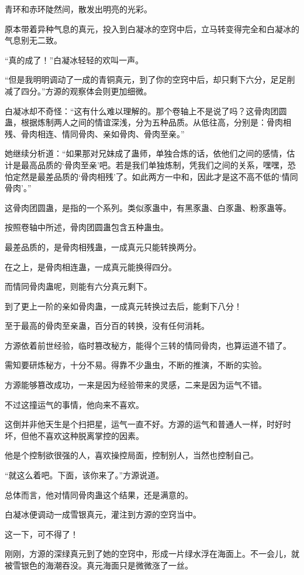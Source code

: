 \begin{this_body}
青环和赤环陡然间，散发出明亮的光彩。

原本带着异种气息的真元，投入到白凝冰的空窍中后，立马转变得完全和白凝冰的气息别无二致。

“真的成了！”白凝冰轻轻的欢叫一声。

“但是我明明调动了一成的青铜真元，到了你的空窍中后，却只剩下六分，足足削减了四分。”方源的观察体会则更加细微。

白凝冰却不奇怪：“这有什么难以理解的。那个卷轴上不是说了吗？这骨肉团圆蛊，根据炼制两人之间的情谊深浅，分为五种品质。从低往高，分别是：骨肉相残、骨肉相连、情同骨肉、亲如骨肉、骨肉至亲。”

她继续分析道：“如果那对兄妹成了蛊师，单独合炼的话，依他们之间的感情，估计是最高品质的‘骨肉至亲’吧。若是我们单独炼制，凭我们之间的关系，嘿嘿，恐怕定然是最差品质的‘骨肉相残’了。如此两方一中和，因此才是这不高不低的‘情同骨肉’。”

这骨肉团圆蛊，是指的一个系列。类似豕蛊中，有黑豕蛊、白豕蛊、粉豕蛊等。

按照卷轴中所述，骨肉团圆蛊包含五种蛊虫。

最差品质的，是骨肉相残蛊，一成真元只能转换两分。

在之上，是骨肉相连蛊，一成真元能换得四分。

而情同骨肉蛊呢，则能有六分真元剩下。

到了更上一阶的亲如骨肉蛊，一成真元转换过去后，能剩下八分！

至于最高的骨肉至亲蛊，百分百的转换，没有任何消耗。

方源依着前世经验，临时篡改秘方，能得个三转的情同骨肉，也算运道不错了。

需知要研炼秘方，十分不易。得靠不少蛊虫，不断的推演，不断的实验。

方源能够篡改成功，一来是因为经验带来的灵感，二来是因为运气不错。

不过这撞运气的事情，他向来不喜欢。

这倒并非他天生是个扫把星，运气一直不好。方源的运气和普通人一样，时好时坏，但他不喜欢这种脱离掌控的因素。

他是个控制欲很强的人，喜欢操控局面，控制别人，当然也控制自己。

“就这么着吧。下面，该你来了。”方源说道。

总体而言，他对情同骨肉蛊这个结果，还是满意的。

白凝冰便调动一成雪银真元，灌注到方源的空窍当中。

这一下，可不得了！

刚刚，方源的深绿真元到了她的空窍中，形成一片绿水浮在海面上。不一会儿，就被雪银色的海潮吞没。真元海面只是微微涨了一丝。


\end{this_body}
